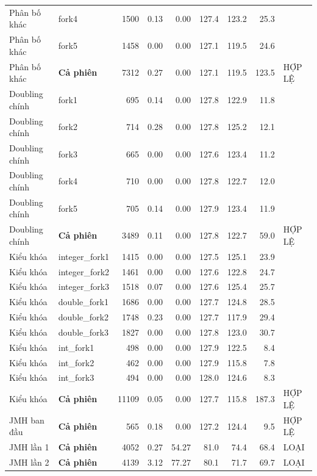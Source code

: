 \begin{longtable}{llrrrrrrl}
Phân bố khác & fork4 & \num{1500} & 0.13 & 0.00 & 127.4 & 123.2 & 25.3 &  \\
Phân bố khác & fork5 & \num{1458} & 0.00 & 0.00 & 127.1 & 119.5 & 24.6 &  \\
Phân bố khác & \textbf{Cả phiên} & \num{7312} & 0.27 & 0.00 & 127.1 & 119.5 & 123.5 & HỢP LỆ \\
Doubling chính & fork1 & \num{695} & 0.14 & 0.00 & 127.8 & 122.9 & 11.8 &  \\
Doubling chính & fork2 & \num{714} & 0.28 & 0.00 & 127.8 & 125.2 & 12.1 &  \\
Doubling chính & fork3 & \num{665} & 0.00 & 0.00 & 127.6 & 123.4 & 11.2 &  \\
Doubling chính & fork4 & \num{710} & 0.00 & 0.00 & 127.8 & 122.7 & 12.0 &  \\
Doubling chính & fork5 & \num{705} & 0.14 & 0.00 & 127.9 & 123.4 & 11.9 &  \\
Doubling chính & \textbf{Cả phiên} & \num{3489} & 0.11 & 0.00 & 127.8 & 122.7 & 59.0 & HỢP LỆ \\
Kiểu khóa & integer\_fork1 & \num{1415} & 0.00 & 0.00 & 127.5 & 125.1 & 23.9 &  \\
Kiểu khóa & integer\_fork2 & \num{1461} & 0.00 & 0.00 & 127.6 & 122.8 & 24.7 &  \\
Kiểu khóa & integer\_fork3 & \num{1518} & 0.07 & 0.00 & 127.6 & 125.4 & 25.7 &  \\
Kiểu khóa & double\_fork1 & \num{1686} & 0.00 & 0.00 & 127.7 & 124.8 & 28.5 &  \\
Kiểu khóa & double\_fork2 & \num{1748} & 0.23 & 0.00 & 127.7 & 117.9 & 29.4 &  \\
Kiểu khóa & double\_fork3 & \num{1827} & 0.00 & 0.00 & 127.8 & 123.0 & 30.7 &  \\
Kiểu khóa & int\_fork1 & \num{498} & 0.00 & 0.00 & 127.9 & 122.5 & 8.4 &  \\
Kiểu khóa & int\_fork2 & \num{462} & 0.00 & 0.00 & 127.9 & 115.8 & 7.8 &  \\
Kiểu khóa & int\_fork3 & \num{494} & 0.00 & 0.00 & 128.0 & 124.6 & 8.3 &  \\
Kiểu khóa & \textbf{Cả phiên} & \num{11109} & 0.05 & 0.00 & 127.7 & 115.8 & 187.3 & HỢP LỆ \\
JMH ban đầu & \textbf{Cả phiên} & \num{565} & 0.18 & 0.00 & 127.2 & 124.4 & 9.5 & HỢP LỆ \\
JMH lần 1 & \textbf{Cả phiên} & \num{4052} & 0.27 & 54.27 & 81.0 & 74.4 & 68.4 & LOẠI \\
JMH lần 2 & \textbf{Cả phiên} & \num{4139} & 3.12 & 77.27 & 80.1 & 71.7 & 69.7 & LOẠI \\

\end{longtable}

